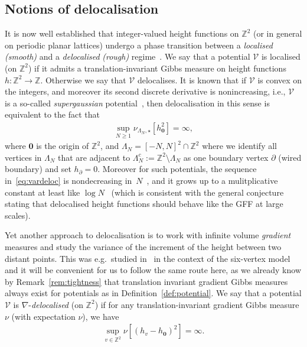 \documentclass[11pt, reqno]{amsart}
\numberwithin{equation}{section}
\theoremstyle{definition}
\theoremstyle{remark}
\newcommand{\exact}{\star}
\begin{document}
\subsection{Notions of delocalisation}
It is now well established that integer-valued height functions on $\mathbb Z^2$ (or in general on periodic planar lattices) undergo a phase transition between a
\emph{localised} \emph{(smooth)} and a \emph{delocalised} \emph{(rough)} regime~\cite{FroSpe,CPST,DHLR,Lis21,DKMO,Lammers,LamOtt,Lammers22,Lam23}. 
We say that a potential $\mathcal V$ is localised (on $\mathbb Z^2$) if it admits a translation-invariant Gibbs measure on height functions $h: \mathbb Z^2\to \mathbb Z$. Otherwise we say that $\mathcal V$ delocalises.
It is known that if $\mathcal V$ is {convex} on the integers, and moreover its second discrete derivative is nonincreasing, i.e., $\mathcal V$ is a so-called \emph{supergaussian} potential~\cite{LamOtt,Lammers22}, then delocalisation in this sense is equivalent to the fact that 
\begin{align} \label{eq:vardeloc}
\sup_{N \geq 1} \nu_{\Lambda_N,\exact}[h_{\mathbf 0}^2] =\infty,
\end{align}
where $\mathbf 0$ is the origin of $\mathbb Z^2$, and $\Lambda_N=[-N,N]^2\cap \mathbb Z^2 $ where we identify all vertices in $\Lambda_N$ that are adjacent to $\Lambda^c_N:=\mathbb Z^2 \setminus \Lambda_N$ as one boundary vertex $\partial$ (wired boundary) and set $h_\partial =0$. Moreover for such potentials, the sequence in~\eqref{eq:vardeloc} is nondecreasing in~$N$~\cite{LamOtt}, and it grows up to a mulitplicative constant at least like $\log N$~\cite{Lammers22} (which is consistent with the general conjecture stating that delocalised height functions should behave like the GFF at large scales). 

Yet another approach to delocalisation is to work with infinite volume \emph{gradient} measures and study the variance of the increment of the height between two distant points. This was e.g.\ studied in~\cite{Lis19,Lis21} in the context of the six-vertex model and it will be convenient for us to follow the same route here, as we already know by Remark~\ref{rem:tightness} that translation invariant gradient Gibbs measures always exist for potentials as in Definition~\ref{def:potential}. 
We say that a potential $\mathcal V$ is $\nabla$-\emph{delocalised} (on $\mathbb Z^2$) if for any translation-invariant gradient Gibbs measure $\nu$ (with expectation $\nu$), we have 
\begin{align} \label{eq:graddeloc}
\sup_{v\in \mathbb Z^2} \nu[(h_v-h_{\mathbf 0})^2]= \infty.
\end{align}
\end{document}
